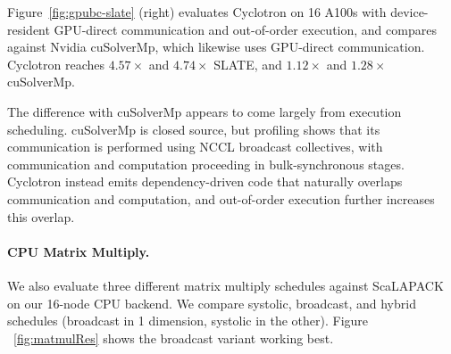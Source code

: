 \documentclass[sigplan, nonacm]{acmart}
\begin{document}
Figure~\ref{fig:gpubc-slate} (right) evaluates Cyclotron on 16 A100s with device-resident GPU-direct communication and out-of-order execution, and compares against Nvidia cuSolverMp, which likewise uses GPU-direct communication. Cyclotron reaches \(4.57\times\) and \(4.74\times\) SLATE, and \(1.12\times\) and \(1.28\times\) cuSolverMp. %

The difference with cuSolverMp appears to come largely from execution scheduling. cuSolverMp is closed source, but profiling shows that its communication is performed using NCCL broadcast collectives, with communication and computation proceeding in bulk-synchronous stages. Cyclotron instead emits dependency-driven code that naturally overlaps communication and computation, and out-of-order execution further increases this overlap. %


\paragraph{CPU Matrix Multiply.} We also evaluate three different matrix multiply schedules against ScaLAPACK on our 16-node CPU backend. We compare systolic, broadcast, and hybrid schedules (broadcast in 1 dimension, systolic in the other). Figure ~\ref{fig:matmulRes} shows the broadcast variant working best.


\end{document}
